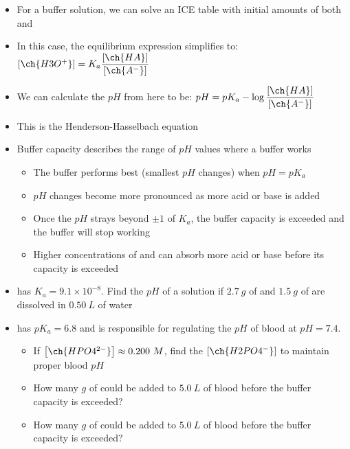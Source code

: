 \documentclass[12pt, openany, letterpaper]{memoir}
\begin{document}
\begin{itemize}
\begin{itemize}
    \item For a buffer solution, we can solve an ICE table with initial amounts of both  and 
    \item In this case, the equilibrium expression simplifies to: $\left[\ch{H3O^+}\right]=K_a\dfrac{\left[\ch{HA}\right]}{\left[\ch{A^-}\right]}$
    \item We can calculate the $pH$ from here to be: $pH = pK_a-\log\dfrac{\left[\ch{HA}\right]}{\left[\ch{A^-}\right]}$
    \item This is the Henderson-Hasselbach equation
    \item Buffer capacity describes the range of $pH$ values where a buffer works
    \begin{itemize}
      \item The buffer performs best (smallest $pH$ changes) when $pH=pK_a$
      \item $pH$ changes become more pronounced as more acid or base is added
      \item Once the $pH$ strays beyond $\pm 1$ of $K_a$, the buffer capacity is exceeded and the buffer will stop working
      \item Higher concentrations of  and  can absorb more acid or base before its capacity is exceeded
    \end{itemize}
    \item {} has $K_a=9.1\times10^{-8}$. Find the $pH$ of a solution if $2.7~g$ of  and $1.5~g$ of  are dissolved in $0.50~L$ of water
    \item {} has $pK_a=6.8$ and is responsible for regulating the $pH$ of blood at $pH=7.4$. 
    \begin{itemize}
      \item If $\left[\ch{HPO4^{2-}}\right]\approx0.200~M$, find the $\left[\ch{H2PO4^{-}}\right]$ to maintain proper blood $pH$
      \item How many $g$ of  could be added to $5.0~L$ of blood before the buffer capacity is exceeded?
      \item How many $g$ of  could be added to $5.0~L$ of blood before the buffer capacity is exceeded?	
    \end{itemize}
  \end{itemize}
\end{itemize}
\end{document}
